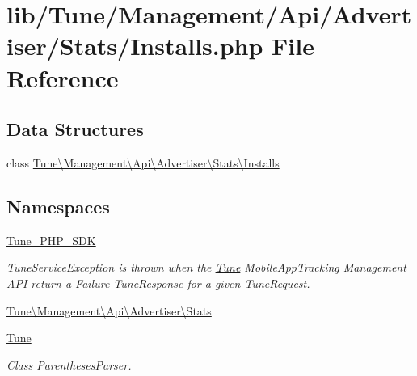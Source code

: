 \hypertarget{Installs_8php}{\section{lib/\-Tune/\-Management/\-Api/\-Advertiser/\-Stats/\-Installs.php File Reference}
\label{Installs_8php}
}
\subsection*{Data Structures}
\begin{DoxyCompactItemize}
\item 
class \hyperlink{classTune_1_1Management_1_1Api_1_1Advertiser_1_1Stats_1_1Installs}{Tune\textbackslash{}\-Management\textbackslash{}\-Api\textbackslash{}\-Advertiser\textbackslash{}\-Stats\textbackslash{}\-Installs}
\end{DoxyCompactItemize}
\subsection*{Namespaces}
\begin{DoxyCompactItemize}
\item 
\hyperlink{namespaceTune__PHP__SDK}{Tune\-\_\-\-P\-H\-P\-\_\-\-S\-D\-K}
\begin{DoxyCompactList}\small\item\em Tune\-Service\-Exception is thrown when the \hyperlink{namespaceTune}{Tune} Mobile\-App\-Tracking Management A\-P\-I return a Failure Tune\-Response for a given Tune\-Request. \end{DoxyCompactList}\item 
\hyperlink{namespaceTune_1_1Management_1_1Api_1_1Advertiser_1_1Stats}{Tune\textbackslash{}\-Management\textbackslash{}\-Api\textbackslash{}\-Advertiser\textbackslash{}\-Stats}
\item 
\hyperlink{namespaceTune}{Tune}
\begin{DoxyCompactList}\small\item\em Class Parentheses\-Parser. \end{DoxyCompactList}\end{DoxyCompactItemize}
